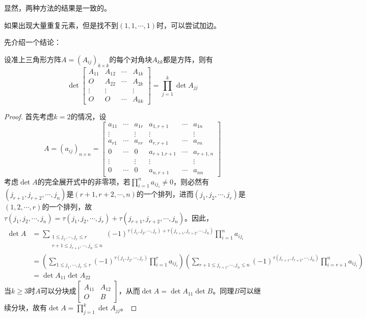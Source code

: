                 显然，两种方法的结果是一致的。

                \begin{note}
                    如果出现大量重复元素，但是找不到$(1,1,\cdots,1)$时，可以尝试加边。
                \end{note}

                先介绍一个结论：

                \begin{proposition}
                    \label{prop:det_uptriangle}
                    设准上三角形方阵$A=(A_{ij})_{k\times k}$的每个对角块$A_{kk}$都是方阵，则有
                    \[\det\begin{bmatrix}A_{11}&A_{12}&\cdots&A_{1k}\\O&A_{22}&\cdots&A_{2k}\\\vdots&\vdots&&\vdots\\O&O&\cdots&A_{kk}\end{bmatrix}=\prod_{j=1}^{k}\det A_{jj}\]
                \end{proposition}

                \begin{proof}
                    首先考虑$k=2$的情况，设
                    \[A=(a_{ij})_{n\times n}=\begin{bmatrix}a_{11}&\cdots&a_{1r}&a_{1,r+1}&\cdots&a_{1n}\\\vdots&&\vdots&\vdots&&\vdots\\a_{r1}&\cdots&a_{rr}&a_{r,r+1}&\cdots&a_{rn}\\0&\cdots&0&a_{r+1.r+1}&\cdots&a_{r+1,n}\\\vdots&&\vdots&\vdots&&\vdots\\0&\cdots&0&a_{n,r+1}&\cdots&a_{nn}\end{bmatrix} \]
                    考虑$\det A$的完全展开式中的非零项，若$\prod\limits_{i=1}^{n}a_{ij_{i}}\neq0$，则必然有$(j_{r+1},j_{r+2},\cdots,j_{n})$是$(r+1,r+2,\cdots,n)$的一个排列，进而$(j_1,j_2,\cdots,j_r)$是$(1,2,\cdots,r)$的一个排列，故$\tau(j_1,j_2,\cdots,j_n)=\tau(j_1,j_2,\cdots,j_r)+\tau(j_{r+1},j_{r+2},\cdots,j_{n})$。因此，
                    \begin{align*}
                            \det A&=\sum_{\substack{1\leq j_1,\cdots,j_r\leq r\\r+1\leq j_{r+1},\cdots,j_n\leq n}}(-1)^{\tau(j_1,j_2,\cdots,j_r)+\tau(j_{r+1},j_{r+2},\cdots,j_{n})}\prod_{i=1}^{n}a_{ij_{i}} \\
                                  &=\left(\sum_{1\leq j_1,\cdots,j_r\leq r}(-1)^{\tau(j_1,j_2,\cdots,j_r)}\prod_{i=1}^{r}a_{ij_{i}}\right)\left(\sum_{r+1\leq j_{r+1},\cdots,j_n\leq n}(-1)^{\tau(j_{r+1},j_{r+2},\cdots,j_{n})}\prod_{i=r+1}^{n}a_{ij_{i}}\right) \\
                                  &=\det A_{11}\det A_{22}
                    \end{align*}
                    当$k\geq 3$时$A$可以分块成$\begin{bmatrix}A_{11}&A_{12}\\O&B\end{bmatrix}$，从而$\det A=\det A_{11}\det B$。同理$B$可以继续分块，故有$\det A=\prod\limits_{j=1}^{k}\det A_{jj}$。
                \end{proof}

